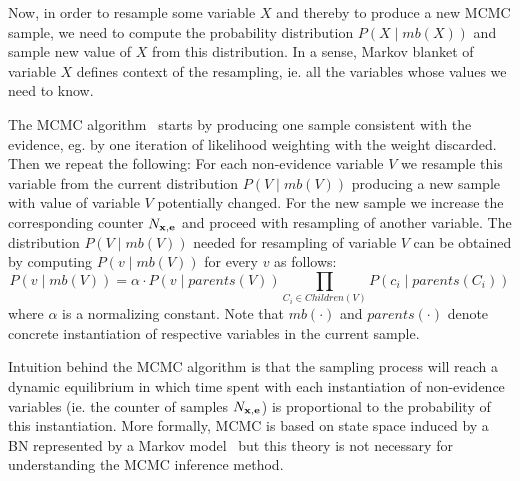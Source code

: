 \documentclass[english,cover]{fitthesis} %
\newcommand{\vars}[1]{{\bold{#1}}}         %
\newcommand{\note}[1]{{\color{green}#1}}
\begin{document}
Now, in order to resample some variable $X$ and thereby to produce a new MCMC sample, we need to compute the probability distribution $P(X \mid mb(X))$ and sample new value of $X$ from this distribution. In a sense, Markov blanket of variable $X$ defines context of the resampling, ie. all the variables whose values we need to know.

The MCMC algorithm~\cite[p.~516]{russell_norvig_ed2} starts by producing one sample consistent with the evidence, eg. by one iteration of likelihood weighting with the weight discarded. Then we repeat the following: For each non-evidence variable $V$ we resample this variable from the current distribution $P(V \mid mb(V))$ producing a new sample with value of variable $V$ potentially changed. For the new sample we increase the corresponding counter $N_{\vars{x},\vars{e}}$ and proceed with resampling of another variable. The distribution $P(V \mid mb(V))$ needed for resampling of variable $V$ can be obtained by computing $P(v \mid mb(V))$ for every $v$ as follows:
\begin{equation*}
    P(v \mid mb(V)) = \alpha \cdot P(v \mid parents(V)) \!\!\!\!\!\!\!\! \prod_{C_i \in Children(V)} \!\!\!\!\!\!\!\!\!\!\!\! P(c_i \mid parents(C_i))
\end{equation*}
where $\alpha$ is a normalizing constant. Note that $mb(\cdot)$ and $parents(\cdot)$ denote concrete instantiation of respective variables in the current sample.

Intuition behind the MCMC algorithm is that the sampling process will reach a dynamic equilibrium in which time spent with each instantiation of non-evidence variables (ie. the counter of samples $N_{\vars{x},\vars{e}}$) is proportional to the probability of this instantiation. More formally, MCMC is based on state space induced by a BN represented by a Markov model~\cite[p.~516]{russell_norvig_ed2} but this theory is not necessary for understanding the MCMC inference method.

\end{document}

